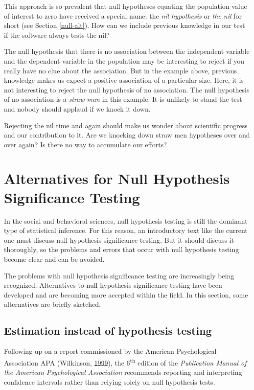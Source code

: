 \documentclass[a4paper]{book}
\theoremstyle{definition}
\theoremstyle{definition}
\theoremstyle{definition}
\theoremstyle{remark}
\begin{document}
This approach is so prevalent that null hypotheses equating the
population value of interest to zero have received a special name: the
\emph{nil hypothesis} or \emph{the nil} for short (see Section
\ref{null-alt}). How can we include previous knowledge in our test if
the software always tests the nil?

The null hypothesis that there is no association between the independent
variable and the dependent variable in the population may be interesting
to reject if you really have no clue about the association. But in the
example above, previous knowledge makes us expect a positive association
of a particular size. Here, it is not interesting to reject the null
hypothesis of no association. The null hypothesis of no association is a
\emph{straw man} in this example. It is unlikely to stand the test and
nobody should applaud if we knock it down.

Rejecting the nil time and again should make us wonder about scientific
progress and our contribution to it. Are we knocking down straw men
hypotheses over and over again? Is there no way to accumulate our
efforts?

\section{Alternatives for Null Hypothesis Significance
Testing}\label{alternatives-for-null-hypothesis-significance-testing}

In the social and behavioral sciences, null hypothesis testing is still
the dominant type of statistical inference. For this reason, an
introductory text like the current one must discuss null hypothesis
significance testing. But it should discuss it thoroughly, so the
problems and errors that occur with null hypothesis testing become clear
and can be avoided.

The problems with null hypothesis significance testing are increasingly
being recognized. Alternatives to null hypothesis significance testing
have been developed and are becoming more accepted within the field. In
this section, some alternatives are briefly sketched.

\subsection{Estimation instead of hypothesis
testing}\label{estimation-instead-of-hypothesis-testing}

Following up on a report commissioned by the American Psychological
Association APA (Wilkinson,
\protect\hyperlink{ref-RefWorks:3934}{1999}), the 6\textsuperscript{th}
edition of the \emph{Publication Manual of the American Psychological
Association} recommends reporting and interpreting confidence intervals
rather than relying solely on null hypothesis tests.
\end{document}
